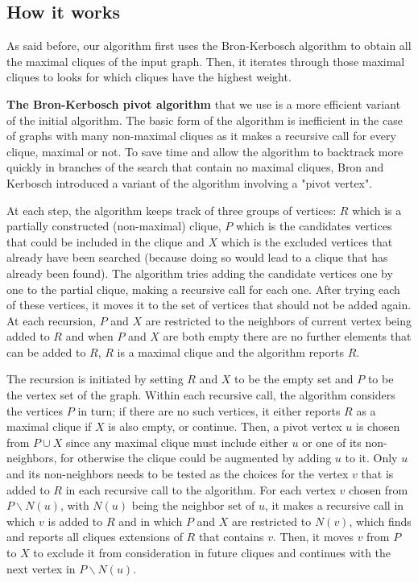 \subsection{How it works}

As said before, our algorithm first uses the Bron-Kerbosch algorithm to obtain
all the maximal cliques of the input graph. Then, it iterates through those maximal
cliques to looks for which cliques have the highest weight. \newline

\textbf{The Bron-Kerbosch pivot algorithm} that we use is a more efficient variant
of the initial algorithm. The basic form of the algorithm is inefficient in the
case of graphs with many non-maximal cliques as it makes a recursive call for
every clique, maximal or not. To save time and allow the algorithm to backtrack
more quickly in branches of the search that contain no maximal cliques, Bron and
Kerbosch introduced a variant of the algorithm involving a "pivot vertex". \newline

At each step, the algorithm keeps track of three groups of vertices: $R$ which is
a partially constructed (non-maximal) clique, $P$ which is the candidates vertices
that could be included in the clique and $X$ which is the excluded vertices that
already have been searched (because doing so would lead to a clique that has
already been found). The algorithm tries adding the candidate vertices one by one
to the partial clique, making a recursive call for each one. After trying each of
these vertices, it moves it to the set of vertices that should not be added again.
At each recursion, $P$ and $X$ are restricted to the neighbors of current vertex
being added to $R$ and when $P$ and $X$ are both empty there are no further
elements that can be added to $R$, $R$ is a maximal clique and the algorithm
reports $R$. \newline

The recursion is initiated by setting $R$ and $X$ to be the empty set and $P$ to
be the vertex set of the graph. Within each recursive call, the algorithm considers
the vertices $P$ in turn; if there are no such vertices, it either reports $R$ as
a maximal clique if $X$ is also empty, or continue. Then, a pivot vertex $u$ is
chosen from $P\cup X$ since any maximal clique must include either $u$ or one of
its non-neighbors, for otherwise the clique could be augmented by adding $u$ to it.
Only $u$ and its non-neighbors needs to be tested as the choices for the vertex
$v$ that is added to $R$ in each recursive call to the algorithm. For each vertex
$v$ chosen from $P\backslash N(u)$, with $N(u)$ being the neighbor set of $u$,
it makes a recursive call in which $v$ is added to $R$ and in which $P$ and $X$
are restricted to $N(v)$, which finds and reports all cliques extensions of $R$
that contains $v$. Then, it moves $v$ from $P$ to $X$ to exclude it from consideration
in future cliques and continues with the next vertex in $P\backslash N(u)$. \newline

